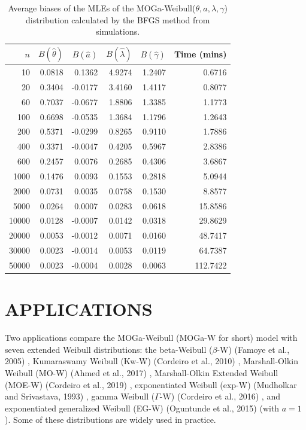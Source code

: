 \documentclass[twoside,leqno,11pt]{article}
\begin{document}
\begin{table}[H]
	\centering
\caption{Average biases of the MLEs of the MOGa-Weibull($\theta, a, \lambda, \gamma$) distribution calculated 
by the BFGS method from simulations.}\label{tab:bias2}
	\begin{tabular}{rrrrrr}
		\hline
		$n$ & $B(\hat{\theta})$ & $B(\hat{a})$ & $B(\hat{\lambda})$ & $B(\hat{\gamma})$ & Time (mins)\\
		\hline
		10 & 0.0818 & 0.1362 & 4.9274 & 1.2407 & 0.6716 \\ 
		20 & 0.3404 & -0.0177 & 3.4160 & 1.4117 & 0.8077 \\ 
		60 & 0.7037 & -0.0677 & 1.8806 & 1.3385 & 1.1773 \\ 
		100 & 0.6698 & -0.0535 & 1.3684 & 1.1796 & 1.2643 \\ 
		200 & 0.5371 & -0.0299 & 0.8265 & 0.9110 & 1.7886 \\ 
		400 & 0.3371 & -0.0047 & 0.4205 & 0.5967 & 2.8386 \\ 
		600 & 0.2457 & 0.0076 & 0.2685 & 0.4306 & 3.6867 \\ 
		1000 & 0.1476 & 0.0093 & 0.1553 & 0.2818 & 5.0944 \\ 
		2000 & 0.0731 & 0.0035 & 0.0758 & 0.1530 & 8.8577 \\ 
		5000 & 0.0264 & 0.0007 & 0.0283 & 0.0618 & 15.8586 \\ 
		10000 & 0.0128 & -0.0007 & 0.0142 & 0.0318 & 29.8629 \\ 
		20000 & 0.0053 & -0.0012 & 0.0071 & 0.0160 & 48.7417 \\ 
		30000 & 0.0023 & -0.0014 & 0.0053 & 0.0119 & 64.7387 \\ 
		50000 & 0.0023 & -0.0004 & 0.0028 & 0.0063 & 112.7422 \\ 
		\hline
\end{tabular}
\end{table}

\section{APPLICATIONS}\label{applications}

Two applications compare the MOGa-Weibull (MOGa-W for short) 
model with seven extended Weibull distributions: the 
beta-Weibull ($\beta$-W) (Famoye et al., 2005) \cite{Famoye}, 
Kumaraswamy Weibull (Kw-W) (Cordeiro et al., 2010) \cite{Cordeiro_2010}, 
Marshall-Olkin Weibull (MO-W) (Ahmed et al., 2017) \cite{Ahmad}, 
Marshall-Olkin Extended Weibull (MOE-W) (Cordeiro et al., 2019) \cite{Cordeiro_2019}, exponentiated Weibull (exp-W) (Mudholkar and Srivastava, 1993) \cite{Mudholkar}, gamma Weibull ($\Gamma$-W) (Cordeiro et al., 2016) \cite{Cordeiro_2016}, 
and exponentiated generalized Weibull 
(EG-W) (Oguntunde et al., 2015) \cite{Oguntunde} (with $a=1$). Some of 
these distributions are widely used in practice.
\end{document}
